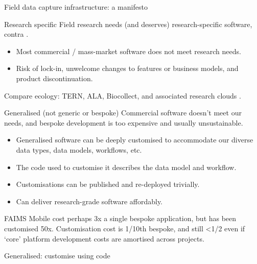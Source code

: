\documentclass[
	aspectratio=169, %
	12pt, %
	t, %
]{beamer}
\begin{document}
\begin{refsegment}
\begin{frame}{Field data capture infrastructure: a manifesto}
\end{frame}
\begin{frame}{Research specific}
    Field research needs (and deserves) research-specific software, contra \parencite{Roosevelt2015-kd}.
      \begin{itemize}
        \item Most commercial / mass-market software does not meet research needs.
        \item Risk of lock-in, unwelcome changes to features or business models, and product discontinuation.
    \end{itemize}
    \medskip{}
    Compare ecology: TERN, ALA, Biocollect, and associated research clouds \parencite{Tern2019-sp, Ala2019-by, Ala2019-cb}.
\end{frame}
\begin{frame}{Generalised (not generic or bespoke)}
  Commercial software doesn't meet our needs, and bespoke development is too expensive and usually unsustainable.
      \begin{itemize}
        \item Generalised software can be deeply customised to accommodate our diverse data types, data models, workflows, etc.
        \item The code used to customise it describes the data model and workflow.
        \item Customisations can be published and re-deployed trivially.
        \item Can deliver research-grade software affordably.  
    \end{itemize}
    FAIMS Mobile cost perhaps 3x a single bespoke application, but has been customised 50x. Customisation cost is 1/10th bespoke, and still <1/2 even if `core' platform development costs are amortised across projects.
\end{frame}
\begin{frame}{Generalised: customise using code}
 \begin{figure}[H]
    \centering
    \vspace{-0.5cm}

\end{figure}
\end{frame}
\end{refsegment}
\end{document}
